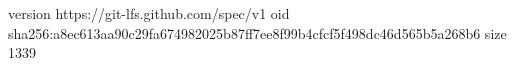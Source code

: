 version https://git-lfs.github.com/spec/v1
oid sha256:a8ec613aa90c29fa674982025b87ff7ee8f99b4cfcf5f498dc46d565b5a268b6
size 1339
